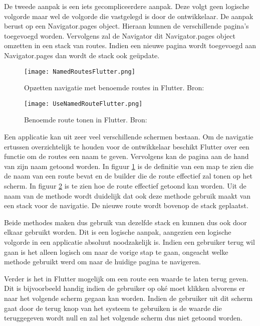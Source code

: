 De tweede aanpak is een iets gecompliceerdere aanpak. Deze volgt geen logische volgorde maar wel de volgorde die vastgelegd is door de ontwikkelaar. De aanpak berust op een Navigator.pages object. Hieraan kunnen de verschillende pagina's toegevoegd worden. Vervolgens zal de Navigator dit Navigator.pages object omzetten in een stack van routes. Indien een nieuwe pagina wordt toegevoegd aan Navigator.pages dan wordt de stack ook geüpdate. 

\begin{figure}
    \texttt{[image: NamedRoutesFlutter.png]}
    \caption{Opzetten navigatie met benoemde routes in Flutter. Bron: \textcite{Flutter.dev2020}}
    \label{fig:namedRoutesFlutter}
\end{figure}

\begin{figure}
    \texttt{[image: UseNamedRouteFlutter.png]}
    \caption{Benoemde route tonen in Flutter. Bron: \textcite{Flutter.dev2020}}
    \label{fig:useNamedRoutesFlutter}
\end{figure}

Een applicatie kan uit zeer veel verschillende schermen bestaan. Om de navigatie ertussen overzichtelijk te houden voor de ontwikkelaar beschikt Flutter over een functie om de routes een naam te geven. Vervolgens kan de pagina aan de hand van zijn naam getoond worden. In figuur \ref{fig:namedRoutesFlutter} is de definitie van een map te zien die de naam van een route bevat en de builder die de route effectief zal tonen op het scherm. In figuur \ref{fig:useNamedRoutesFlutter} is te zien hoe de route effectief getoond kan worden. Uit de naam van de methode wordt duidelijk dat ook deze methode gebruik maakt van een stack voor de navigatie. De nieuwe route wordt bovenop de stack geplaatst.

Beide methodes maken dus gebruik van dezelfde stack en kunnen dus ook door elkaar gebruikt worden. Dit is een logische aanpak, aangezien een logische volgorde in een applicatie absoluut noodzakelijk is. Indien een gebruiker terug wil gaan is het alleen logisch om naar de vorige stap te gaan, ongeacht welke methode gebruikt werd om naar de huidige pagina te navigeren. 

Verder is het in Flutter mogelijk om een route een waarde te laten terug geven. Dit is bijvoorbeeld handig indien de gebruiker op oké moet klikken alvorens er naar het volgende scherm gegaan kan worden. Indien de gebruiker uit dit scherm gaat door de terug knop van het systeem te gebruiken is de waarde die teruggegeven wordt null en zal het volgende scherm dus niet getoond worden.

